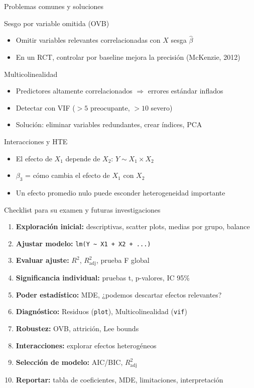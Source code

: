 \documentclass[aspectratio=169, 11pt]{beamer}
\begin{document}
\begin{frame}{Problemas comunes y soluciones}
\begin{block}{Sesgo por variable omitida (OVB)}
\begin{itemize}
  \item Omitir variables relevantes correlacionadas con $X$ sesga $\hat{\beta}$
  \item En un RCT, controlar por baseline mejora la precisión (McKenzie, 2012)
\end{itemize}
\end{block}

\begin{block}{Multicolinealidad}
\begin{itemize}
  \item Predictores altamente correlacionados $\Rightarrow$ errores estándar inflados
  \item Detectar con VIF ($> 5$ preocupante, $> 10$ severo)
  \item Solución: eliminar variables redundantes, crear índices, PCA
\end{itemize}
\end{block}

\begin{block}{Interacciones y HTE}
\begin{itemize}
  \item El efecto de $X_1$ depende de $X_2$: $Y \sim X_1 \times X_2$
  \item $\beta_3$ = cómo cambia el efecto de $X_1$ con $X_2$
  \item Un efecto promedio nulo puede esconder heterogeneidad importante
\end{itemize}
\end{block}
\end{frame}

\begin{frame}{Checklist para su examen y futuras investigaciones}
\small
\begin{enumerate}\setlength{\itemsep}{1pt}
  \item \textbf{Exploración inicial:} descriptivas, scatter plots, medias por grupo, balance
  \item \textbf{Ajustar modelo:} \texttt{lm(Y \textasciitilde{} X1 + X2 + ...)}
  \item \textbf{Evaluar ajuste:} $R^2$, $R^2_{\text{adj}}$, prueba F global
  \item \textbf{Significancia individual:} pruebas t, p-valores, IC 95\%
  \item \textbf{Poder estadístico:} MDE, ¿podemos descartar efectos relevantes?
  \item \textbf{Diagnóstico:} Residuos (\texttt{plot}), Multicolinealidad (\texttt{vif})
  \item \textbf{Robustez:} OVB, attrición, Lee bounds
  \item \textbf{Interacciones:} explorar efectos heterogéneos
  \item \textbf{Selección de modelo:} AIC/BIC, $R^2_{\text{adj}}$
  \item \textbf{Reportar:} tabla de coeficientes, MDE, limitaciones, interpretación
\end{enumerate}
\end{frame}
\end{document}
